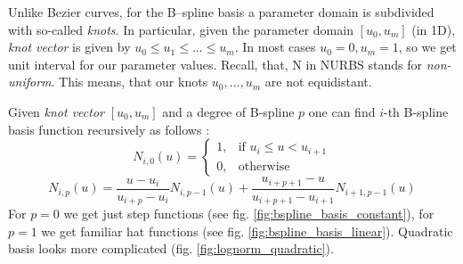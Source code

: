 Unlike Bezier curves, for the B--spline basis a parameter domain is subdivided with so-called \textit{knots}. In particular, given the parameter domain $[u_{0}, u_{m}]$ (in 1D), \textit{knot vector} is given by $u_{0} \leq u_{1} \leq ... \leq u_{m}$. In most cases $u_{0} = 0, u_{m} = 1$, so we get unit interval for our parameter values. Recall, that, N in NURBS stands for \textit{non-uniform}. This means, that our knots $u_{0},..., u_{m}$ are not equidistant. %

Given \textit{knot vector} $[u_{0}, u_{m}]$ and a degree of B-spline $p$ one can find $i$-th B-spline basis function recursively as follows \cite{farin1999nurbs}:
\begin{equation}
N_{i,0}(u) =  \begin{cases} 1, & \mbox{if } u_{i} \leq u < u_{i+1} \\ 0, & \mbox{otherwise } \end{cases}
\end{equation} 
\begin{equation}
N_{i,p}(u) = \frac{u - u_{i}}{u_{i+p} - u_{i}}N_{i, p-1}(u)  + \frac{u_{i+p+1}-u}{u_{i+p+1} - u_{i+1}}N_{i+1, p-1}(u)
\end{equation}
For $p=0$ we get just step functions (see fig. \ref{fig:bspline_basis_constant}), for $p=1$ we get familiar hat functions (see fig. \ref{fig:bspline_basis_linear}). Quadratic basis looks more complicated (fig. \ref{fig:lognorm_quadratic}).
